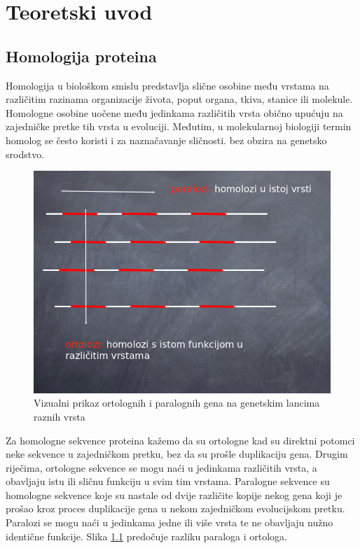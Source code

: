 \chapter{Teoretski uvod}
\label{chap:teoretski-uvod}

\section{Homologija proteina}
\label{sec:homologija}

Homologija u biološkom smislu predstavlja slične osobine među vrstama na
različitim razinama organizacije života, poput organa, tkiva, stanice ili
molekule. Homologne osobine uočene među jedinkama različitih vrsta obično
upućuju na zajedničke pretke tih vrsta u evoluciji. Međutim, u molekularnoj
biologiji termin homolog se često koristi i za naznačavanje sličnosti. bez
obzira na genetsko srodstvo.\cite{bioinfo1}

\begin{figure}[h!]
\centering
\includegraphics[width=4.5in]{figures/ortho-para.png}
\caption{Vizualni prikaz ortolognih i paralognih gena na genetskim lancima
raznih vrsta}
\label{fig:para-ortho}
\end{figure}

Za homologne sekvence proteina kažemo da su ortologne kad su direktni
potomci neke sekvence u zajedničkom pretku, bez da su prošle duplikaciju
gena. Drugim riječima, ortologne sekvence se mogu naći u jedinkama
različitih vrsta, a obavljaju istu ili sličnu funkciju u svim tim vrstama.
Paralogne sekvence su homologne sekvence koje su nastale od dvije različite
kopije nekog gena koji je prošao kroz proces duplikacije gena u nekom
zajedničkom evolucijskom pretku. Paralozi se mogu naći u jedinkama jedne ili
više vrsta te ne obavljaju nužno identične funkcije. Slika \ref{fig:para-ortho}
predočuje razliku paraloga i ortologa.


